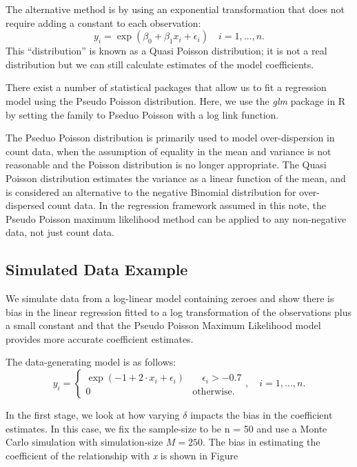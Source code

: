 \documentclass[
]{article}
\begin{document}
The alternative method is by using an exponential transformation that
does not require adding a constant to each observation:
\[ y_i = \exp \left( \beta_0 + \beta_1 x_i + \epsilon_i \right) \quad i = 1, \ldots, n . \]
This ``distribution'' is known as a Quasi Poisson distribution; it is
not a real distribution but we can still calculate estimates of the
model coefficients.

There exist a number of statistical packages that allow us to fit a
regression model using the Pseudo Poisson distribution. Here, we use the
\emph{glm} package in R by setting the family to Pseduo Poisson with a
log link function.

The Pseduo Poisson distribution is primarily used to model
over-dispersion in count data, when the assumption of equality in the
mean and variance is not reasonable and the Poisson distribution is no
longer appropriate. The Quasi Poisson distribution estimates the
variance as a linear function of the mean, and is considered an
alternative to the negative Binomial distribution for over-dispersed
count data. In the regression framework assumed in this note, the Pseudo
Poisson maximum likelihood method can be applied to any non-negative
data, not just count data.

\hypertarget{simulated-data-example}{%
\subsection{Simulated Data Example}\label{simulated-data-example}}

We simulate data from a log-linear model containing zeroes and show
there is bias in the linear regression fitted to a log transformation of
the observations plus a small constant and that the Pseudo Poisson
Maximum Likelihood model provides more accurate coefficient estimates.

The data-generating model is as follows: \[ y_i = 
\begin{cases} \exp \left( -1 + 2 \cdot x_i + \epsilon_i \right) & \quad \epsilon_i > -0.7 \\
            0 & \text{otherwise.} \end{cases} , \quad i = 1, \ldots, n.
\]

In the first stage, we look at how varying \(\delta\) impacts the bias
in the coefficient estimates. In this case, we fix the sample-size to be
n = 50 and use a Monte Carlo simulation with simulation-size
\(M = 250\). The bias in estimating the coefficient of the relationship
with \emph{x} is shown in Figure
\end{document}
